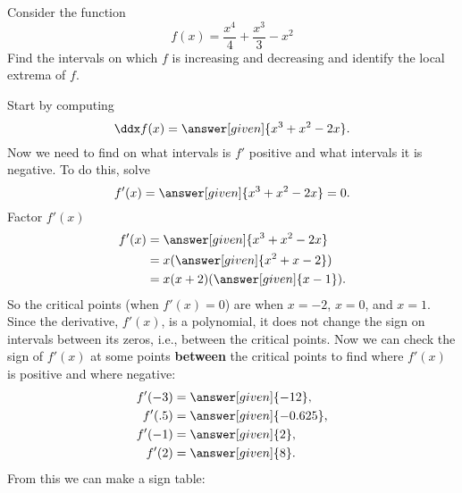 \documentclass{ximera}
\begin{document}
\begin{example}\label{E:localextrema}
Consider the function 
\[
f(x) = \frac{x^4}{4}+\frac{x^3}{3}-x^2
\]
Find the intervals on which $f$ is increasing and decreasing and
identify the local extrema of $f$.


\begin{explanation}
Start by computing
\[
\ddx f(x) = \answer[given]{x^3+x^2-2x}.
\]
Now we need to find on what intervals is $f'$ positive and what intervals it is
negative. To do this, solve 
\[
f'(x) = \answer[given]{x^3+x^2-2x} =0.
\]
Factor $f'(x)$
\begin{align*}
f'(x) &= \answer[given]{x^3+x^2-2x} \\
&=x(\answer[given]{x^2+x-2})\\
&=x(x+2)(\answer[given]{x-1}).
\end{align*}
So the critical points (when $f'(x)=0$) are when $x=-2$, $x=0$, and
$x=1$. Since the derivative, $f'(x)$, is a polynomial, it does not change the sign on intervals between its zeros, i.e., between the critical points. Now we can check the sign of $f'(x)$ at some points \textbf{between} the critical points to find
where $f'(x)$ is positive and where negative:
\begin{align*}
  f'(-3)&=\answer[given]{-12},\\
  f'(.5)&=\answer[given]{-0.625},\\
  f'(-1)&=\answer[given]{2},\\
  f'(2)&=\answer[given]{8}.
\end{align*}
From this we can make a sign table:

\begin{image}
\end{image}
\end{explanation}
\end{example}
\end{document}
